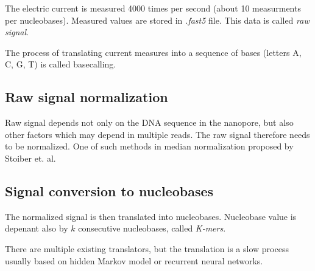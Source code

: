 The electric current is measured 4000 times per second (about 10 measurments per nucleobases).
Measured values are stored in \textit{.fast5} file. This data is called \textit{raw signal}.

The process of translating current measures into a sequence of bases (letters A, C, G, T) is called
basecalling.

\subsection{Raw signal normalization}

Raw signal depends not only on the DNA sequence in the nanopore, but also other factors which may
depend in multiple reads. The raw signal therefore needs to be normalized. One of such methods in
median normalization proposed by Stoiber et. al. \cite{batmendijn_bakalarka}

\subsection{Signal conversion to nucleobases}

The normalized signal is then translated into nucleobases. Nucleobase value is depenant also by $k$
consecutive nucleobases, called \textit{K-mers}. 

There are multiple existing translators, but the translation is a slow process usually based on
hidden Markov model or recurrent neural networks. \cite{barbora_bakalarka}
